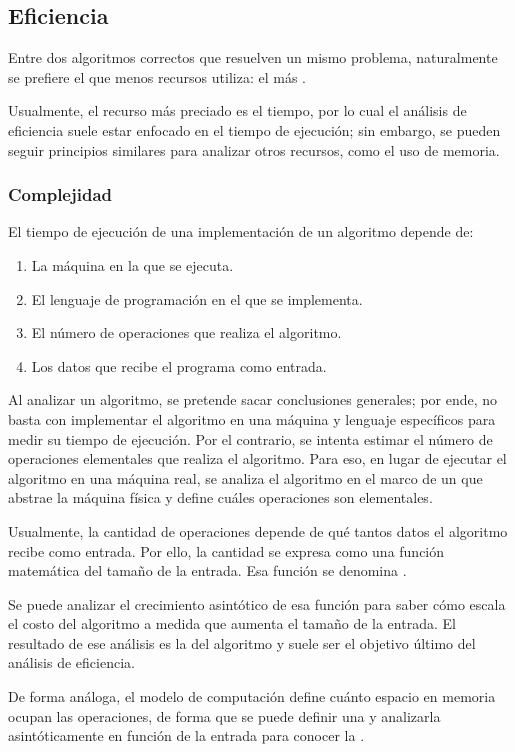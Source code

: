 \subsection{Eficiencia}
\label{sec:eficiencia}

Entre dos algoritmos correctos que resuelven un mismo problema, naturalmente se prefiere el que menos recursos utiliza: el más .

Usualmente, el recurso más preciado es el tiempo, por lo cual el análisis de eficiencia suele estar enfocado en el tiempo de ejecución; sin embargo, se pueden seguir principios similares para analizar otros recursos, como el uso de memoria.

\subsubsection{Complejidad}

El tiempo de ejecución de una implementación de un algoritmo depende de:
\begin{enumerate}
  \item La máquina en la que se ejecuta.
  \item El lenguaje de programación en el que se implementa.
  \item El número de operaciones que realiza el algoritmo.
  \item Los datos que recibe el programa como entrada.
\end{enumerate}

Al analizar un algoritmo, se pretende sacar conclusiones generales; por ende, no basta con implementar el algoritmo en una máquina y lenguaje específicos para medir su tiempo de ejecución. Por el contrario, se intenta estimar el número de operaciones elementales que realiza el algoritmo. Para eso, en lugar de ejecutar el algoritmo en una máquina real, se analiza el algoritmo en el marco de un  que abstrae la máquina física y define cuáles operaciones son elementales.

Usualmente, la cantidad de operaciones depende de qué tantos datos el algoritmo recibe como entrada. Por ello, la cantidad se expresa como una función matemática del tamaño de la entrada. Esa función se denomina .

Se puede analizar el crecimiento asintótico de esa función para saber cómo escala el costo del algoritmo a medida que aumenta el tamaño de la entrada. El resultado de ese análisis es la  del algoritmo y suele ser el objetivo último del análisis de eficiencia.

De forma análoga, el modelo de computación define cuánto espacio en memoria ocupan las operaciones, de forma que se puede definir una  y analizarla asintóticamente en función de la entrada para conocer la .


